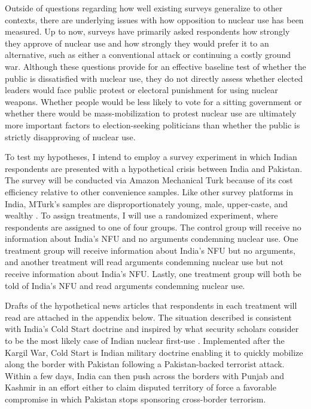 \documentclass[12pt]{article}
\begin{document}
Outside of questions regarding how well existing surveys generalize to other contexts, there are underlying issues with how opposition to nuclear use has been measured. Up to now, surveys have primarily asked respondents how strongly they approve of nuclear use and how strongly they would prefer it to an alternative, such as either a conventional attack or continuing a costly ground war. Although these questions provide for an effective baseline test of whether the public is dissatisfied with nuclear use, they do not directly assess whether elected leaders would face public protest or electoral punishment for using nuclear weapons. Whether people would be less likely to vote for a sitting government or whether there would be mass-mobilization to protest nuclear use are ultimately more important factors to election-seeking politicians than whether the public is strictly disapproving of nuclear use.

To test my hypotheses, I intend to employ a survey experiment in which Indian respondents are presented with a hypothetical crisis between India and Pakistan. The survey will be conducted via Amazon Mechanical Turk because of its cost efficiency relative to other convenience samples. Like other survey platforms in India, MTurk's samples are disproportionately young, male, upper-caste, and wealthy \citep{boas_recruiting_2020}. To assign treatments, I will use a randomized experiment, where respondents are assigned to one of four groups. The control group will receive no information about India's NFU and no arguments condemning nuclear use. One treatment group will receive information about India's NFU but no arguments, and another treatment will read arguments condemning nuclear use but not receive information about India's NFU. Lastly, one treatment group will both be told of India's NFU and read arguments condemning nuclear use.

Drafts of the hypothetical news articles that respondents in each treatment will read are attached in the appendix below. The situation described is consistent with India's Cold Start doctrine and inspired by what security scholars consider to be the most likely case of Indian nuclear first-use \citep{kapur_ten_2008, clary_indias_2019}. Implemented after the Kargil War, Cold Start is Indian military doctrine enabling it to quickly mobilize along the border with Pakistan following a Pakistan-backed terrorist attack. Within a few days, India can then push across the borders with Punjab and Kashmir in an effort either to claim disputed territory of force a favorable compromise in which Pakistan stops sponsoring cross-border terrorism. 
\end{document}
